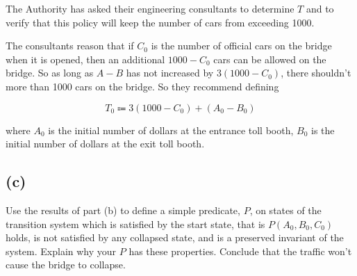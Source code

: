 \documentclass[14pt]{extarticle}
\begin{document}
The Authority has asked their engineering consultants to determine $T$ and to verify that this policy will keep the number of cars from exceeding 1000.

The consultants reason that if $C_0$ is the number of official cars on the bridge when it is opened, then an additional $1000 - C_0$ cars can be allowed on the bridge. So as long as $A - B$ has not increased by $3(1000 - C_0)$, there shouldn’t more than 1000 cars on the bridge. So they recommend defining 

$$
T_0 \Coloneqq 3(1000 - C_0) + (A_0 - B_0)
$$

where $A_0$ is the initial number of dollars at the entrance toll booth, $B_0$ is the initial number of dollars at the exit toll booth.

\subsection{(c)}
Use the results of part (b) to define a simple predicate, $P$, on states of the transition system which is satisfied by the start state, that is $P(A_0, B_0, C_0)$ holds, is not satisfied by any collapsed state, and is a preserved invariant of the system. Explain why your $P$ has these properties. Conclude that the traffic won’t cause the bridge to collapse.
\end{document}
